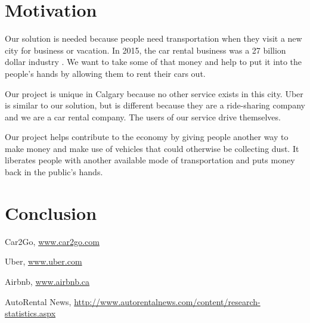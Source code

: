 \documentclass{article}
\begin{document}
\section{Motivation}
Our solution is needed because people need transportation when they visit a new
city for business or vacation. In 2015, the car rental business was a 27
billion dollar industry \cite{marketdata}. We want to take some of that money
and help to put it into the people's hands by allowing them to rent their cars
out.

Our project is unique in Calgary because no other service exists in this city.
Uber is similar to our solution, but is different because they are a
ride-sharing company and we are a car rental company. The users of our service
drive themselves.

Our project helps contribute to the economy by giving people another way to
make money and make use of vehicles that could otherwise be collecting dust. It
liberates people with another available mode of transportation and puts money
back in the public's hands.

\section{Conclusion}
\begin{thebibliography}{9}

  Car2Go,
  \url{www.car2go.com}

  Uber,
  \url{www.uber.com}

  Airbnb,
  \url{www.airbnb.ca}

  AutoRental News,
  \url{http://www.autorentalnews.com/content/research-statistics.aspx}

\end{thebibliography}
\end{document}
